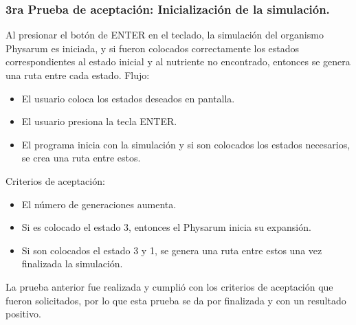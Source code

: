 \subsubsection{3ra Prueba de aceptaci\'on: Inicializaci\'on de la simulaci\'on.}
    Al presionar el bot\'on de ENTER en el teclado, la simulaci\'on
        del organismo Physarum es iniciada, y si fueron colocados
        correctamente los estados correspondientes al estado inicial
        y al nutriente no encontrado, entonces se genera una ruta
        entre cada estado.
    \vskip 0.5cm
    Flujo:
    \vskip 0.5cm
    \begin{itemize}
        \item El usuario coloca los estados deseados en pantalla.
        \item El usuario presiona la tecla ENTER.
        \item El programa inicia con la simulaci\'on y si son colocados
            los estados necesarios, se crea una ruta entre estos.
    \end{itemize}
    \vskip 0.5cm
    Criterios de aceptaci\'on:
    \begin{itemize}
        \item El n\'umero de generaciones aumenta.
        \item Si es colocado el estado 3, entonces el Physarum inicia
        su expansi\'on.
        \item Si son colocados el estado 3 y 1, se genera una ruta entre
        estos una vez finalizada la simulaci\'on.
    \end{itemize}
    \vskip 0.5cm
    La prueba anterior fue realizada y cumpli\'o con los criterios
    de aceptaci\'on que fueron solicitados, por lo que esta prueba
    se da por finalizada y con un resultado positivo.
    \vskip 0.5cm
